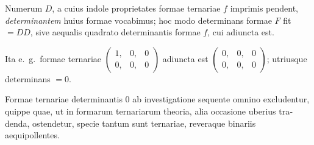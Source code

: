 \documentclass[12pt,a4paper]{article}
\theoremstyle{plain}
\theoremstyle{definition}
\theoremstyle{remark}
\begin{document}
\begin{otherlanguage}{latin}
Numerum $D$, a cuius indole proprietates formae ternariae $f$ imprimis pendent, \emph{determinantem} huius formae vocabimus; hoc modo determinans formae $F$ fit $= DD$, sive aequalis quadrato determinantis formae $f$, cui adiuncta est.

Ita e.\ g.\ formae ternariae $\begin{pmatrix} 1, & 0, & 0 \\ 0, & 0, & 0 \end{pmatrix}$ adiuncta est $\begin{pmatrix} 0, & 0, & 0 \\ 0, & 0, & 0 \end{pmatrix}$; utriusque determinans $= 0$.

Formae ternariae determinantis $0$ ab investigatione sequente omnino excludentur, quippe quae, ut in formarum ternariarum theoria, alia occasione uberius tradenda, ostendetur, specie tantum sunt ternariae, reveraque binariis aequipollentes.

\end{otherlanguage}
\end{document}
